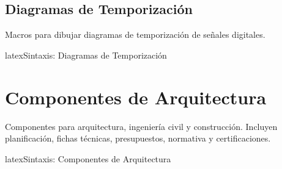 \subsection{Diagramas de Temporización}
\label{subsec:timing}

Macros para dibujar diagramas de temporización de señales digitales.

\begin{codigosimple}{latex}{Sintaxis: Diagramas de Temporización}
\end{codigosimple}

\begin{center}
\end{center}


\section{Componentes de Arquitectura}
\label{sec:comp-arquitectura}

Componentes para arquitectura, ingeniería civil y construcción. Incluyen
planificación, fichas técnicas, presupuestos, normativa y certificaciones.

\begin{codigosimple}{latex}{Sintaxis: Componentes de Arquitectura}
\usepackage[arquitectura]{eps-componentes}
\end{codigosimple}

